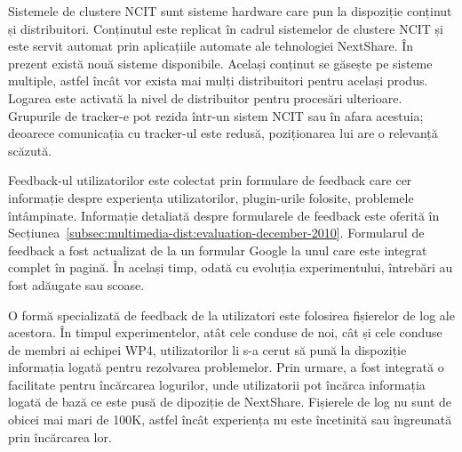 Sistemele de clustere NCIT sunt sisteme hardware care pun la dispoziție
conținut și distribuitori. Conținutul este replicat în cadrul sistemelor de
clustere NCIT și este servit automat prin aplicațiile automate ale tehnologiei
NextShare. În prezent există nouă sisteme disponibile. Același conținut se
găsește pe sisteme multiple, astfel încât vor exista mai mulți distribuitori
pentru același produs. Logarea este activată la nivel de distribuitor pentru
procesări ulterioare. Grupurile de tracker-e pot rezida într-un sistem
NCIT sau în afara acestuia; deoarece comunicația cu tracker-ul este redusă,
poziționarea lui are o relevanță scăzută.

Feedback-ul utilizatorilor este colectat prin formulare de feedback care cer
informație despre experiența utilizatorilor, plugin-urile folosite,
problemele întâmpinate. Informație detaliată despre formularele de feedback
este oferită în Secțiunea~\ref{subsec:multimedia-dist:evaluation-december-2010}.
Formularul de feedback a fost actualizat de la un formular Google la unul
care este integrat complet în pagină. În același timp, odată cu evoluția 
experimentului, întrebări au fost adăugate sau scoase.

O formă specializată de feedback de la utilizatori este folosirea fișierelor
de log ale acestora. În timpul experimentelor, atât cele conduse de noi, cât
și cele conduse de membri ai echipei WP4, utilizatorilor li s-a cerut să
pună la dispoziție informația logată pentru rezolvarea problemelor. Prin urmare,
a fost integrată o facilitate pentru încărcarea logurilor, unde utilizatorii
pot încărca informația logată de bază ce este pusă de dipoziție de NextShare.
Fișierele de log nu sunt de obicei mai mari de 100K, astfel încât experiența
nu este încetinită sau îngreunată prin încărcarea lor.

